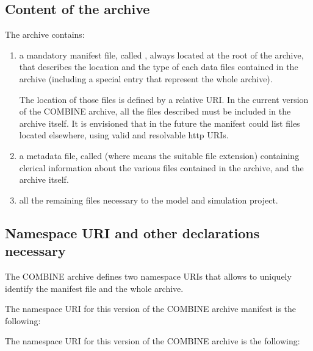 \subsection{Content of the archive}

The archive contains: 

\begin{enumerate}
	\item {
	
     a mandatory manifest file, called , always located at the 
     root of the archive, that describes the location and the type of each 
     data files contained in the archive (including a special entry that represent
     the whole archive).
     
     The location of those files is defined by a relative URI. In the current 
     version of the COMBINE archive, all the files described must be included 
     in the archive itself. It is envisioned that in the future the manifest 
     could list files located elsewhere, using valid and resolvable http 
     URIs. 

	}
	\item {
     a metadata file, called  (where \token{*} means the 
     suitable file extension) containing clerical information about the 
     various files contained in the archive, and the archive itself. 
	}
	\item {all the remaining files necessary to the model and simulation project. }

\end{enumerate}

\subsection{Namespace URI and other declarations necessary}
\label{xml-namespace}

The COMBINE archive defines two namespace URIs that allows to uniquely 
identify the manifest file and the whole archive.

The namespace URI for this version of the COMBINE archive manifest is the following: 

\begin{center}
\end{center}

The namespace URI for this version of the COMBINE archive is the following: 

\begin{center}
\end{center}



